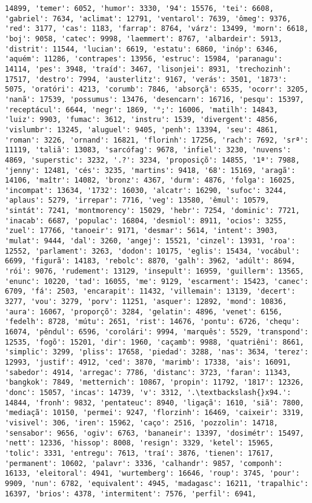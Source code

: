 \documentclass[11pt]{article}
\begin{document}
\begin{Verbatim}[commandchars=\\\{\}]
14899, 'temer': 6052, 'humor': 3330, '94': 15576, 'tei': 6608, 'gabriel': 7634, 'aclimat': 12791, 'ventarol': 7639, 'ômeg': 9376, 'red': 3177, 'cas': 1183, 'farrap': 8764, 'várz': 13499, 'morn': 6618, 'boj': 9058, 'catec': 9998, 'laemmert': 8767, 'albardeir': 5913, 'distrit': 11544, 'lucian': 6619, 'estatu': 6860, 'inóp': 6346, 'aquém': 11286, 'contrapes': 13956, 'estruc': 15984, 'paranagu': 14114, 'pes': 3948, 'traíd': 3467, 'lisonjei': 8931, 'trechozinh': 17517, 'destro': 7994, 'austerlitz': 9167, 'verás': 3501, '1873': 5075, 'oratóri': 4213, 'corumb': 7846, 'absorçã': 6535, 'ocorr': 3205, 'nanã': 17539, 'possumus': 13476, 'desencarn': 16716, 'pesqu': 15397, 'receptácul': 6644, 'negr': 1869, '°;': 16006, 'matilh': 14843, 'luiz': 9903, 'fumac': 3612, 'instru': 1539, 'divergent': 4856, 'vislumbr': 13245, 'aluguel': 9405, 'penh': 13394, 'seu': 4861, 'roman': 3226, 'ornand': 16821, 'florinh': 17256, 'rach': 7692, 'srª': 11119, 'taliã': 13083, 'sarcófag': 9678, 'infiel': 3230, 'nuvens': 4869, 'superstic': 3232, '.?': 3234, 'proposiçõ': 14855, '1ª': 7988, 'jenny': 12481, 'cés': 3235, 'martins': 9418, '68': 15169, 'aragã': 14106, 'maîtr': 14082, 'bronz': 4367, 'durm': 4876, 'folga': 16025, 'incompat': 13634, '1732': 16030, 'alcatr': 16290, 'sufoc': 3244, 'aplaus': 5279, 'irrepar': 7716, 'veg': 13580, 'êmul': 10579, 'sintát': 7241, 'montmorency': 15029, 'hebr': 7254, 'dominic': 7721, 'inacab': 6687, 'populac': 16804, 'desmiol': 8911, 'ocios': 3255, 'zuel': 17766, 'tanoeir': 9171, 'desmar': 5614, 'intent': 3903, 'mulat': 9444, 'dal': 3260, 'angej': 15521, 'cinzel': 13931, 'roa': 12552, 'parlament': 3263, 'dodon': 10175, 'eglis': 15434, 'vocábul': 6699, 'figurã': 14183, 'rebolc': 8870, 'galh': 3962, 'adúlt': 8694, 'rói': 9076, 'rudement': 13129, 'insepult': 16959, 'guillerm': 13565, 'enunc': 10220, 'tad': 16055, 'me': 9129, 'escarment': 15423, 'canec': 6709, 'fá': 2503, 'encarapit': 11432, 'villemain': 13139, 'decert': 3277, 'vou': 3279, 'porv': 11251, 'asquer': 12892, 'mond': 10836, 'aura': 16067, 'proporçõ': 3284, 'gelatin': 4896, 'venet': 6156, 'fedelh': 8728, 'mútu': 2651, 'rist': 14676, 'pontu': 6726, 'chequ': 16074, 'pêndul': 6596, 'corolári': 9994, 'marquês': 5529, 'transpond': 12535, 'fogõ': 15201, 'dir': 1960, 'caçamb': 9988, 'quatriêni': 8661, 'simplic': 3299, 'pliss': 17658, 'piedad': 3288, 'nas': 3634, 'terez': 12993, 'justif': 4912, 'ced': 3870, 'marimb': 17338, 'ais': 16091, 'sabedor': 4914, 'arregac': 7786, 'distanc': 3723, 'faran': 11343, 'bangkok': 7849, 'metternich': 10867, 'propin': 11792, '1817': 12326, 'donc': 15057, 'incas': 14739, 'v': 3312, '.\textbackslash{}x94.': 14844, 'fronh': 9832, 'pentateuc': 8940, 'ligaçã': 1610, 'siã': 7800, 'mediaçã': 10150, 'permei': 9247, 'florzinh': 16469, 'caixeir': 3319, 'visivel': 306, 'iren': 15962, 'caço': 2516, 'pozzolin': 14718, 'sensabor': 9656, 'ogiv': 6763, 'bananeir': 13397, 'dosimétr': 15497, 'nett': 12336, 'hissop': 8008, 'resign': 3329, 'ketel': 15965, 'tolic': 3331, 'entregu': 7613, 'traí': 3876, 'tienen': 17617, 'permanent': 10602, 'palavr': 3336, 'calhandr': 9857, 'componh': 16133, 'eleitoral': 4941, 'wurtemberg': 16646, 'roup': 3745, 'pour': 9909, 'nun': 6782, 'equivalent': 4945, 'madagasc': 16211, 'trapalhic': 16397, 'brios': 4378, 'intermitent': 7576, 'perfil': 6941, 
\end{Verbatim}
\end{document}
